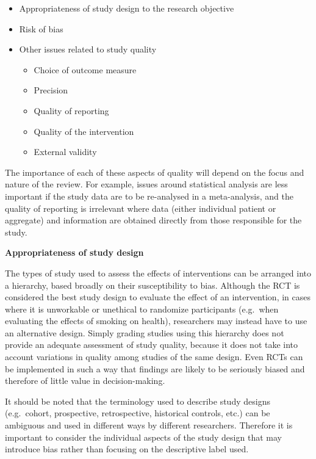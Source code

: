 \documentclass[
  10pt,
  a4paper,
  DIV=11,
  numbers=noendperiod]{scrreprt}
\begin{document}
\begin{itemize}
\item
  Appropriateness of study design to the research objective
\item
  Risk of bias
\item
  Other issues related to study quality

  \begin{itemize}
  \item
    Choice of outcome measure
  \item
    Precision
  \item
    Quality of reporting
  \item
    Quality of the intervention
  \item
    External validity
  \end{itemize}
\end{itemize}

The importance of each of these aspects of quality will depend on the
focus and nature of the review. For example, issues around statistical
analysis are less important if the study data are to be re-analysed in a
meta-analysis, and the quality of reporting is irrelevant where data
(either individual patient or aggregate) and information are obtained
directly from those responsible for the study.

\textbf{Appropriateness of study design}

The types of study used to assess the effects of interventions can be
arranged into a hierarchy, based broadly on their susceptibility to
bias. Although the RCT is considered the best study design to evaluate
the effect of an intervention, in cases where it is unworkable or
unethical to randomize participants (e.g.~when evaluating the effects of
smoking on health), researchers may instead have to use an alternative
design. Simply grading studies using this hierarchy does not provide an
adequate assessment of study quality, because it does not take into
account variations in quality among studies of the same design. Even
RCTs can be implemented in such a way that findings are likely to be
seriously biased and therefore of little value in decision-making.

It should be noted that the terminology used to describe study designs
(e.g.~cohort, prospective, retrospective, historical controls, etc.) can
be ambiguous and used in different ways by different researchers.
Therefore it is important to consider the individual aspects of the
study design that may introduce bias rather than focusing on the
descriptive label used.
\end{document}
